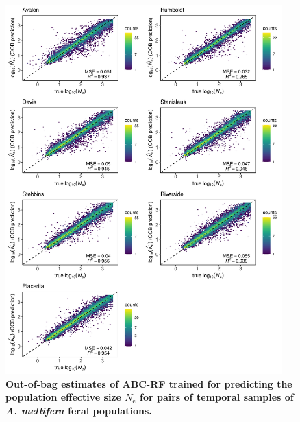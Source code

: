 \documentclass[a4paper, 12pt]{article}
\begin{document}
\begin{figure}[ht]
  \centering
  \includegraphics[width=0.95\textwidth]{Figures/FigureS15_combined_plot_ne.pdf}
  \small\caption{\textbf{Out-of-bag estimates of ABC-RF trained for predicting the population effective size $N_{\mathrm{e}}$ for pairs of temporal samples of \textit{A. mellifera} feral populations.}}
  \label{fig:supple_feralbee_NE}
\end{figure}
\end{document}
